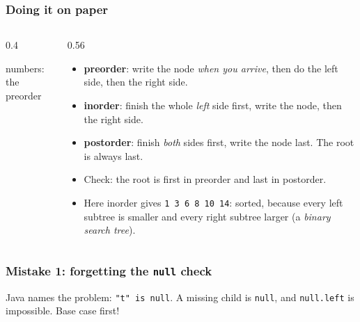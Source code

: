 \documentclass[aspectratio=169,10pt,compress]{beamer}
\begin{document}
\begin{frame}[t,fragile] \frametitle{Doing it on paper}
  \begin{columns}[T]
    \begin{column}{0.4\textwidth}
      \begin{center}
      \end{center}
      \small numbers: the preorder
    \end{column}
    \begin{column}{0.56\textwidth}
      \begin{itemize}\small
        \item \textbf{preorder}: write the node \emph{when you arrive}, then do the left side, then the right side.
        \item \textbf{inorder}: finish the whole \emph{left} side first, write the node, then the right side.
        \item \textbf{postorder}: finish \emph{both} sides first, write the node last. The root is always last.
        \item Check: the root is first in preorder and last in postorder.
        \item Here inorder gives \texttt{1 3 6 8 10 14}: sorted, because every left subtree is smaller and every right subtree larger
              (a \emph{binary search tree}).
      \end{itemize}
    \end{column}
  \end{columns}
\end{frame}





\begin{frame}[t,fragile] \frametitle{Mistake 1: forgetting the \texttt{null} check}

  \vspace{0.2em}
  \small Java names the problem: \texttt{"t" is null}. A missing child is \texttt{null}, and \texttt{null.left} is impossible. Base case first!
\end{frame}
\end{document}
